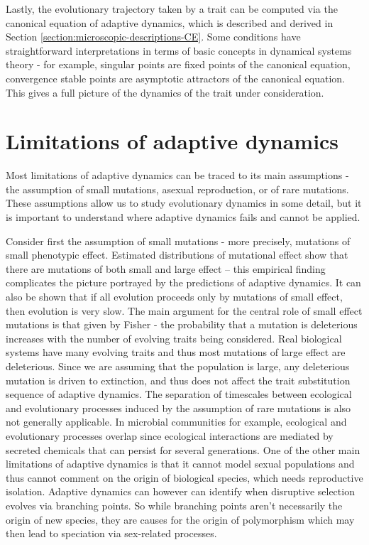 Lastly, the evolutionary trajectory taken by a trait can be computed via the canonical equation of adaptive dynamics, which is described and derived in Section \ref{section:microscopic-descriptions-CE}.
Some conditions have straightforward interpretations in terms of basic concepts in dynamical systems theory - for example, singular points are fixed points of the canonical equation, convergence stable points are asymptotic attractors of the canonical equation.
This gives a full picture of the dynamics of the trait under consideration.

\section{Limitations of adaptive dynamics}
\label{section:limitations}

Most limitations of adaptive dynamics can be traced to its main assumptions - the assumption of small mutations, asexual reproduction, or of rare mutations. These assumptions allow us to study evolutionary dynamics in some detail, but it is important to understand where adaptive dynamics fails and cannot be applied. 

Consider first the assumption of small mutations - more precisely, mutations of small phenotypic effect. 
Estimated distributions of mutational effect show that there are mutations of both small and large effect -- this empirical finding complicates the picture portrayed by the predictions of adaptive dynamics. 
It can also be shown that if all evolution proceeds only by mutations of small effect, then evolution is very slow.
The main argument for the central role of small effect mutations is that given by Fisher - the probability that a mutation is deleterious increases with the number of evolving traits being considered. 
Real biological systems have many evolving traits and thus most mutations of large effect are deleterious.
Since we are assuming that the population is large, any deleterious mutation is driven to extinction, and thus does not affect the trait substitution sequence of adaptive dynamics.
The separation of timescales between ecological and evolutionary processes induced by the assumption of rare mutations is also not generally applicable.
In microbial communities for example, ecological and evolutionary processes overlap since ecological interactions are mediated by secreted chemicals that can persist for several generations. 
One of the other main limitations of adaptive dynamics is that it cannot model sexual populations and thus cannot comment on the origin of biological species, which needs reproductive isolation. 
Adaptive dynamics can however can identify when disruptive selection evolves via branching points. 
So while branching points aren't necessarily the origin of new species, they are causes for the origin of polymorphism which may then lead to speciation via sex-related processes.

